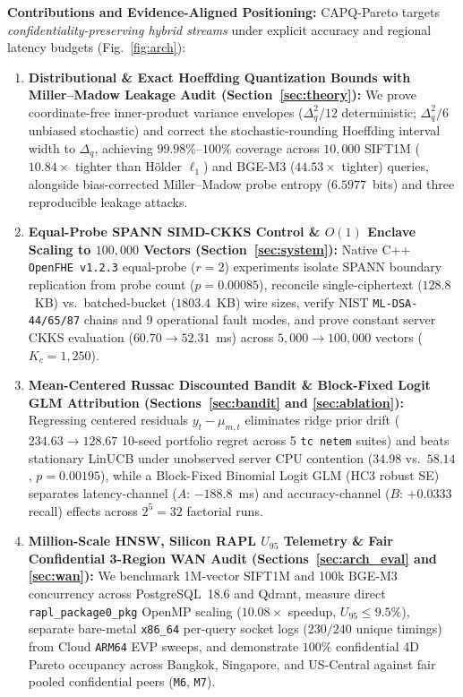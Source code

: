 \documentclass[10pt,journal,compsoc]{IEEEtran}
\begin{document}
\textbf{Contributions and Evidence-Aligned Positioning:} CAPQ-Pareto targets \emph{confidentiality-preserving hybrid streams} under explicit accuracy and regional latency budgets (Fig.~\ref{fig:arch}):
\begin{enumerate}
    \item \textbf{Distributional \& Exact Hoeffding Quantization Bounds with Miller--Madow Leakage Audit (Section~\ref{sec:theory}):} We prove coordinate-free inner-product variance envelopes ($\Delta_q^2/12$ deterministic; $\Delta_q^2/6$ unbiased stochastic) and correct the stochastic-rounding Hoeffding interval width to $\Delta_q$, achieving $99.98\%$--$100\%$ coverage across $10{,}000$ SIFT1M ($10.84\times$ tighter than H\"{o}lder $\ell_1$) and BGE-M3 ($44.53\times$ tighter) queries, alongside bias-corrected Miller--Madow probe entropy ($6.5977$~bits) and three reproducible leakage attacks.
    \item \textbf{Equal-Probe SPANN SIMD-CKKS Control \& $O(1)$ Enclave Scaling to $100{,}000$ Vectors (Section~\ref{sec:system}):} Native C++ \texttt{OpenFHE v1.2.3} equal-probe ($r=2$) experiments isolate SPANN boundary replication from probe count ($p=0.00085$), reconcile single-ciphertext ($128.8$~KB) vs.\ batched-bucket ($1803.4$~KB) wire sizes, verify NIST \texttt{ML-DSA-44/65/87} chains and 9 operational fault modes, and prove constant server CKKS evaluation ($60.70\rightarrow 52.31$~ms) across $5{,}000\rightarrow 100{,}000$ vectors ($K_c=1{,}250$).
    \item \textbf{Mean-Centered Russac Discounted Bandit \& Block-Fixed Logit GLM Attribution (Sections~\ref{sec:bandit} and \ref{sec:ablation}):} Regressing centered residuals $y_t - \mu_{m,t}$ eliminates ridge prior drift ($234.63\rightarrow 128.67$ 10-seed portfolio regret across 5 \texttt{tc netem} suites) and beats stationary LinUCB under unobserved server CPU contention ($34.98$ vs.\ $58.14$, $p=0.00195$), while a Block-Fixed Binomial Logit GLM (HC3 robust SE) separates latency-channel ($A$: $-188.8$~ms) and accuracy-channel ($B$: $+0.0333$ recall) effects across $2^5=32$ factorial runs.
    \item \textbf{Million-Scale HNSW, Silicon RAPL $U_{95}$ Telemetry \& Fair Confidential 3-Region WAN Audit (Sections~\ref{sec:arch_eval} and \ref{sec:wan}):} We benchmark 1M-vector SIFT1M and 100k BGE-M3 concurrency across PostgreSQL~18.6 and Qdrant, measure direct \texttt{rapl\_package0\_pkg} OpenMP scaling ($10.08\times$ speedup, $U_{95} \le 9.5\%$), separate bare-metal \texttt{x86\_64} per-query socket logs ($230/240$ unique timings) from Cloud \texttt{ARM64} EVP sweeps, and demonstrate $100\%$ confidential 4D Pareto occupancy across Bangkok, Singapore, and US-Central against fair pooled confidential peers (\texttt{M6}, \texttt{M7}).
\end{enumerate}
\end{document}
